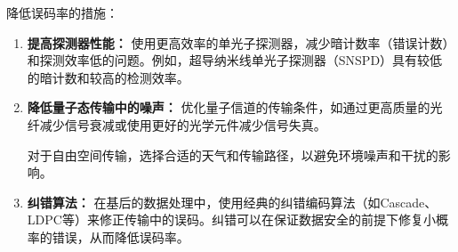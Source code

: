 \documentclass[dvipsnames, svgnames,a4paper,11pt]{article}
\begin{document}
	降低误码率的措施：
	\begin{enumerate}
		\item \textbf{提高探测器性能：}
			使用更高效率的单光子探测器，减少暗计数率（错误计数）和探测效率低的问题。例如，超导纳米线单光子探测器（SNSPD）具有较低的暗计数和较高的检测效率。

		\item \textbf{降低量子态传输中的噪声：}
			优化量子信道的传输条件，如通过更高质量的光纤减少信号衰减或使用更好的光学元件减少信号失真。
		
			对于自由空间传输，选择合适的天气和传输路径，以避免环境噪声和干扰的影响。

		\item \textbf{纠错算法：}
			在基后的数据处理中，使用经典的纠错编码算法（如Cascade、LDPC等）来修正传输中的误码。纠错可以在保证数据安全的前提下修复小概率的错误，从而降低误码率。
	\end{enumerate}
\end{document}
